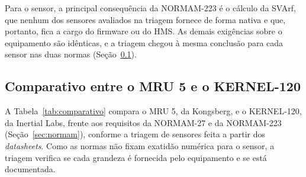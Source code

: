 \documentclass[a4paper, 12pt]{article}
\begin{document}
\vspace{-0.6cm}

Para o sensor, a principal consequência da NORMAM-223 é o cálculo da SVArf, que nenhum dos
sensores avaliados na triagem fornece de forma nativa e que, portanto, fica a cargo do
firmware ou do HMS. As demais exigências sobre o equipamento são idênticas, e a triagem
chegou à mesma conclusão para cada sensor nas duas normas
(Seção~\ref{sec:comparativo}).

\subsection{Comparativo entre o MRU 5 e o KERNEL-120}\label{sec:comparativo}

A Tabela~\ref{tab:comparativo} compara o MRU 5, da Kongsberg, e o KERNEL-120, da Inertial Labs, frente aos requisitos da NORMAM-27 e da NORMAM-223 (Seção~\ref{sec:normam}), conforme a triagem de sensores feita a partir dos \textit{datasheets}. Como as normas não fixam exatidão numérica para o sensor, a triagem verifica se cada grandeza é fornecida pelo equipamento e se está documentada.
\end{document}
